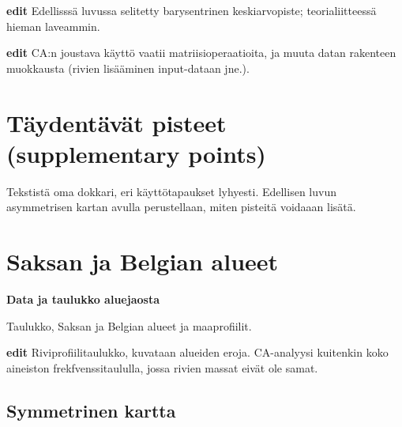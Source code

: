 \documentclass[
  finnish,
]{book}
\begin{document}
\textbf{edit} Edellisssä luvussa selitetty barysentrinen keskiarvopiste;
teorialiitteessä hieman laveammin.

\textbf{edit} CA:n joustava käyttö vaatii matriisioperaatioita, ja muuta
datan rakenteen muokkausta (rivien lisääminen input-dataan jne.).

\hypertarget{tuxe4ydentuxe4vuxe4t-pisteet-supplementary-points}{%
\section{Täydentävät pisteet (supplementary
points)}\label{tuxe4ydentuxe4vuxe4t-pisteet-supplementary-points}}

Tekstistä oma dokkari, eri käyttötapaukset lyhyesti. Edellisen luvun
asymmetrisen kartan avulla perustellaan, miten pisteitä voidaaan lisätä.

\hypertarget{saksan-ja-belgian-alueet}{%
\section{Saksan ja Belgian alueet}\label{saksan-ja-belgian-alueet}}

\textbf{Data ja taulukko aluejaosta}

Taulukko, Saksan ja Belgian alueet ja maaprofiilit.

\textbf{edit} Riviprofiilitaulukko, kuvataan alueiden eroja. CA-analyysi
kuitenkin koko aineiston frekfvenssitaululla, jossa rivien massat eivät
ole samat.

\hypertarget{symmetrinen-kartta}{%
\subsection{Symmetrinen kartta}\label{symmetrinen-kartta}}
\end{document}

